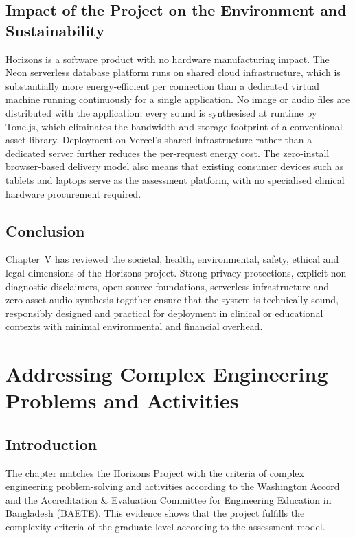 \documentclass[12pt,a4paper,oneside]{report}
\begin{document}
	\section{Impact of the Project on the Environment and Sustainability}
	
	Horizons is a software product with no hardware manufacturing impact. The Neon serverless database platform runs on shared cloud infrastructure, which is substantially more energy-efficient per connection than a dedicated virtual machine running continuously for a single application. No image or audio files are distributed with the application; every sound is synthesised at runtime by Tone.js, which eliminates the bandwidth and storage footprint of a conventional asset library. Deployment on Vercel's shared infrastructure rather than a dedicated server further reduces the per-request energy cost. The zero-install browser-based delivery model also means that existing consumer devices such as tablets and laptops serve as the assessment platform, with no specialised clinical hardware procurement required.
	
	\section{Conclusion}
	
	Chapter~V has reviewed the societal, health, environmental, safety, ethical and legal dimensions of the Horizons project. Strong privacy protections, explicit non-diagnostic disclaimers, open-source foundations, serverless infrastructure and zero-asset audio synthesis together ensure that the system is technically sound, responsibly designed and practical for deployment in clinical or educational contexts with minimal environmental and financial overhead.
	
	\clearpage
	\chapter{Addressing Complex Engineering Problems and Activities}
	
	\section{Introduction}
	
	The chapter matches the Horizons Project with the criteria of complex engineering problem-solving and activities according to the Washington Accord and the Accreditation \& Evaluation Committee for Engineering Education in Bangladesh (BAETE). This evidence shows that the project fulfills the complexity criteria of the graduate level according to the assessment model.
	
\end{document}
